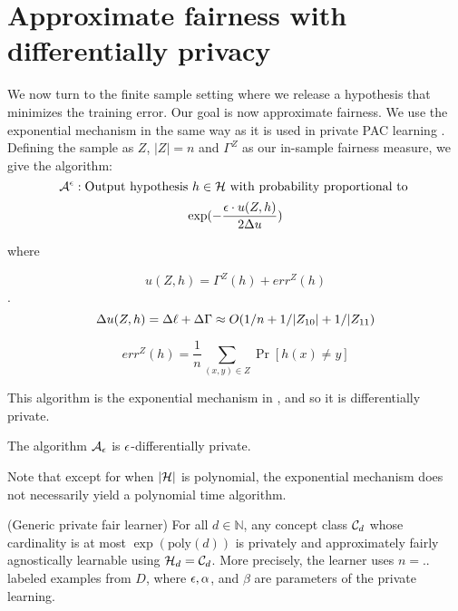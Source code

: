 
\section{Approximate fairness with differentially privacy}



We now turn to the finite sample setting where we release a hypothesis
that minimizes the training error. Our goal is now approximate
fairness. We use the exponential mechanism in the same way as it is
used in private PAC learning \cite{Kasiviswanathan:2011:WLP:2078965.2078976}.
Defining the sample as $Z$, $|Z| = n$ and
$\Gamma^{Z}$ as our in-sample fairness measure, we give the algorithm:
$$\mathcal{A}^\epsilon : \text{Output hypothesis }h \in \mathcal{H} \text{
	with probability proportional to }$$
\begin{align}
\exp(-\frac{\epsilon \cdot u(Z,h)}{2\Delta u})
\end{align}

where

$$u(Z,h) = \Gamma^Z(h) + err^Z(h)$$.
$$\Delta u(Z,h) = \Delta\ell + \Delta{\Gamma} \approx O(1/n+1/|Z_{10}|+1/|Z_{11})$$

$$err^Z(h) = \frac{1}{n} \sum_{(x,y) \in Z}\Pr[h(x) \neq y]$$



This algorithm is the exponential mechanism in \citet{McSherry:2007:MDV:1333875.1334185}, and so it is differentially private.

\begin{lemma}
	The algorithm $\mathcal{A}_\epsilon$ is $\epsilon$-differentially private.
\end{lemma}

Note that except for when $|\mathcal{H}|$ is polynomial, the exponential
mechanism does not necessarily yield a polynomial time algorithm.


\begin{theorem}
	(Generic private fair learner) For all $d \in \mathbb{N}$, any
	concept class $\mathcal{C}_d$ whose cardinality is at most
	$\exp(\text{poly}(d))$ is privately and approximately fairly
	agnostically learnable using $\mathcal{H}_d = \mathcal{C}_d$. More precisely, the
	learner uses $n = ..$ labeled examples from $D$, where $\epsilon,
	\alpha$, and $\beta$ are parameters of the private learning.
\end{theorem}

